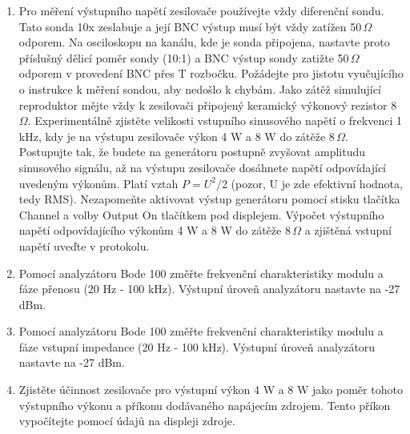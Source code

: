 \documentclass[a4paper, czech]{article}
\begin{document}
\begin{enumerate}
    \item Pro měření výstupního napětí zesilovače používejte vždy diferenční sondu. Tato sonda 10x zeslabuje a její BNC výstup musí být vždy zatížen 50\,$\Omega$ odporem. Na osciloskopu na kanálu, kde je sonda připojena, nastavte proto příslušný dělicí poměr sondy (10:1) a BNC výstup sondy zatižte 50\,$\Omega$ odporem v provedení BNC přes T rozbočku. Požádejte pro jistotu vyučujícího o instrukce k měření sondou, aby nedošlo k chybám. Jako zátěž simulující reproduktor mějte vždy k zesilovači připojený keramický výkonový rezistor 8\,$\Omega$. Experimentálně zjistěte velikosti vstupního sinusového napětí o frekvenci 1 kHz, kdy je na výstupu zesilovače výkon 4 W a 8 W do zátěže 8\,$\Omega$. Postupujte tak, že budete na generátoru postupně zvyšovat amplitudu sinusového signálu, až na výstupu zesilovače dosáhnete napětí odpovídající uvedeným výkonům. Platí vztah $P = U^2$/2 (pozor, U je zde efektivní hodnota, tedy RMS). Nezapomeňte aktivovat výstup generátoru pomocí stisku tlačítka Channel a volby Output On tlačítkem pod displejem. Výpočet výstupního napětí odpovídajícího výkonům 4 W a 8 W do zátěže 8\,$\Omega$ a zjištěná vstupní napětí uveďte v protokolu.
    \item Pomocí analyzátoru Bode 100 změřte frekvenční charakteristiky modulu a fáze přenosu (20 Hz - 100 kHz). Výstupní úroveň analyzátoru nastavte na -27 dBm.
    \item Pomocí analyzátoru Bode 100 změřte frekvenční charakteristiky modulu a fáze vstupní impedance (20 Hz - 100 kHz). Výstupní úroveň analyzátoru nastavte na -27 dBm.
    \item Zjistěte účinnost zesilovače pro výstupní výkon 4 W a 8 W jako poměr tohoto výstupního výkonu a příkonu dodávaného napájecím zdrojem. Tento příkon vypočítejte pomocí údajů na displeji zdroje.

\end{enumerate}
\end{document}
